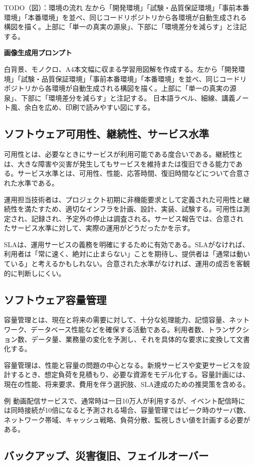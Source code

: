 \documentclass[uplatex,dvipdfmx,a4paper,10pt]{jsarticle}
\newcommand{\todoprompt}[2]{%
\begin{notebox}{TODO（図）：#1}
#2

\textbf{画像生成用プロンプト}

白背景、モノクロ、A4本文幅に収まる学習用図解を作成する。#2 日本語ラベル、細線、講義ノート風、余白を広め、印刷で読みやすい図にする。
\end{notebox}
}
\begin{document}
\todoprompt{環境の流れ}{左から「開発環境」「試験・品質保証環境」「事前本番環境」「本番環境」を並べ、同じコードリポジトリから各環境が自動生成される構図を描く。上部に「単一の真実の源泉」、下部に「環境差分を減らす」と注記する。}

\subsection{ソフトウェア可用性、継続性、サービス水準}

可用性とは、必要なときにサービスが利用可能である度合いである。継続性とは、大きな障害や災害が発生してもサービスを維持または復旧できる能力である。サービス水準とは、可用性、性能、応答時間、復旧時間などについて合意された水準である。

運用担当技術者は、プロジェクト初期に非機能要求として定義された可用性と継続性を満たすため、適切なインフラを計画、設計、実装、試験する。可用性は測定され、記録され、予定外の停止は調査される。サービス報告では、合意されたサービス水準に対して、実際の運用がどうだったかを示す。

SLAは、運用サービスの義務を明確にするために有効である。SLAがなければ、利用者は「常に速く、絶対に止まらない」ことを期待し、提供者は「通常は動いている」と考えるかもしれない。合意された水準がなければ、運用の成否を客観的に判断しにくい。

\subsection{ソフトウェア容量管理}

容量管理とは、現在と将来の需要に対して、十分な処理能力、記憶容量、ネットワーク、データベース性能などを確保する活動である。利用者数、トランザクション数、データ量、業務量の変化を予測し、それを具体的な要求に変換して文書化する。

容量管理は、性能と容量の問題の中心となる。新規サービスや変更サービスを設計するとき、想定負荷を見積もり、必要な資源をモデル化する。容量計画には、現在の性能、将来要求、費用を伴う選択肢、SLA達成のための推奨策を含める。

\begin{pointbox}{例}
動画配信サービスで、通常時は一日10万人が利用するが、イベント配信時には同時接続が10倍になると予測される場合、容量管理ではピーク時のサーバ数、ネットワーク帯域、キャッシュ戦略、負荷分散、監視しきい値を計画する必要がある。
\end{pointbox}

\subsection{バックアップ、災害復旧、フェイルオーバー}
\end{document}
